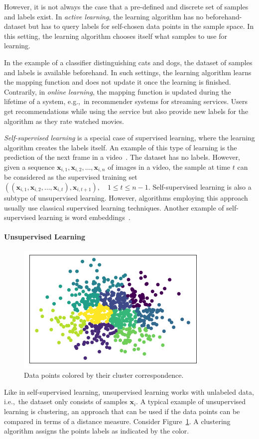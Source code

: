 However, it is not always the case that a pre-defined and discrete set of samples and labels exist.
In \textit{active learning}, the learning algorithm has no beforehand-dataset but has to query labels for self-chosen data points in the sample space.
In this setting, the learning algorithm chooses itself what samples to use for learning.

In the example of a classifier distinguishing cats and dogs, the dataset of samples and labels is available beforehand.
In such settings, the learning algorithm learns the mapping function and does not update it once the learning is finished.
Contrarily, in \textit{online learning}, the mapping function is updated during the lifetime of a system, e.g.,~in recommender systems for streaming services.
Users get recommendations while using the service but also provide new labels for the algorithm as they rate watched movies.

\textit{Self-supervised learning} is a special case of supervised learning, where the learning algorithm creates the labels itself.
An example of this type of learning is the prediction of the next frame in a video~\citep{walker2016uncertain}.
The dataset has no labels.
However, given a sequence $\bm{x}_{i,1},\bm{x}_{i,2},\dots,\bm{x}_{i,n}$ of images in a video, the sample at time $t$ can be considered as the supervised training set $((\bm{x}_{i,1},\bm{x}_{i,2},\dots,\bm{x}_{i,t}),\bm{x}_{i,t+1}), \quad 1\leq t\leq n-1$.
Self-supervised learning is also a subtype of unsupervised learning.
However, algorithms employing this approach usually use classical supervised learning techniques.
Another example of self-supervised learning is word embeddings~\citep{mikolov2013efficient}.

\paragraph{Unsupervised Learning}
\begin{figure}
    \centering
    \includegraphics[width=.48\textwidth]{images/clustering_example.png}
    \caption[Clusters of data points]{Data points colored by their cluster correspondence.}
    \label{fig:clustering_example}
\end{figure}
Like in self-supervised learning, unsupervised learning works with unlabeled data, i.e.,~the dataset only consists of samples $\bm{x}_i$.
A typical example of unsupervised learning is clustering, an approach that can be used if the data points can be compared in terms of a distance measure.
Consider Figure~\ref{fig:clustering_example}.
A clustering algorithm assigns the points labels as indicated by the color.

